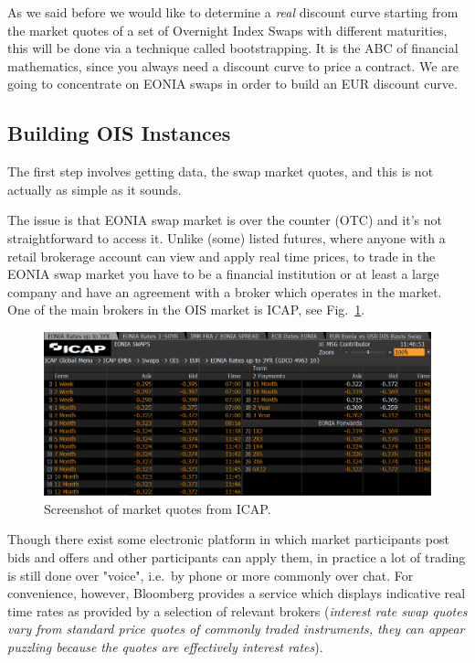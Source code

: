 As we said before we would like to determine a \emph{real} discount
curve starting from the market quotes of a set of Overnight Index Swaps
with different maturities, this will be done via a technique called
bootstrapping. It is the ABC of financial mathematics, since you
always need a discount curve to price a contract. We are
going to concentrate on EONIA swaps in order to build an EUR discount
curve.

\subsection{Building OIS Instances}
\label{building-ois-instances}

The first step involves getting data, the swap market quotes, and this is not actually as simple as it sounds.

The issue is that EONIA swap market is over the counter (OTC) and it's not straightforward to access it. Unlike (some) listed futures, where anyone with a retail brokerage account can view and apply real time prices, to trade in the EONIA swap market you have to be a financial institution or at least a large company and have an agreement with a broker which operates in the market. One of the main brokers in the OIS market is ICAP, see Fig.~\ref{fig:icap}.

\begin{figure}[bth]
  \centering
\includegraphics[width=1.\linewidth]{figures/icap_3.png}
\caption{Screenshot of market quotes from ICAP.}
\label{fig:icap}
\end{figure}

Though there exist some electronic platform in which market participants post bids and offers and other participants can apply them, in practice a lot of trading is still done over "voice", i.e.~by phone or more
commonly over chat. For convenience, however, Bloomberg provides a service which displays indicative real time rates as provided by a selection of relevant brokers (\emph{interest rate swap quotes vary from standard price quotes of commonly traded instruments, they can appear puzzling because the quotes are effectively interest rates}).

